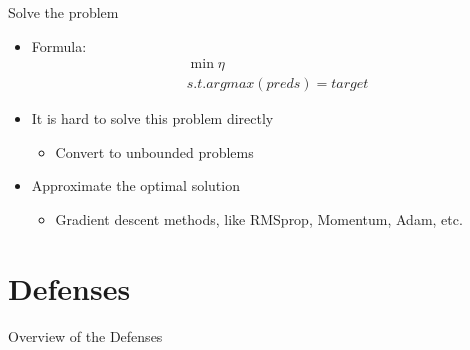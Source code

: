 \documentclass[
 size=12pt,
 paper=smartboard, %
 mode=present, %
 display=slides, %
style=tuliplab,
pauseslide,
fleqn,leqno]{powerdot}
\begin{document}
\begin{slide}{Solve the problem}
  \begin{itemize}
    \item Formula:
    \begin{equation}
      \begin{split}
      &\min{\eta} \\
      &s.t. argmax(preds) = target
      \end{split}
    \end{equation}  \pause
    \item It is hard to solve this problem directly \pause
    \begin{itemize}
      \item Convert to unbounded problems \pause
    \end{itemize}
    \item Approximate the optimal solution \pause
    \begin{itemize}
      \item Gradient descent methods, like RMSprop, Momentum, Adam, etc.
    \end{itemize}
  \end{itemize}
\end{slide}


\section{Defenses}

\begin{slide}[toc=,bm=]{Overview of the Defenses}
\tableofcontents[content=currentsection,type=0]
\end{slide}
\end{document}
